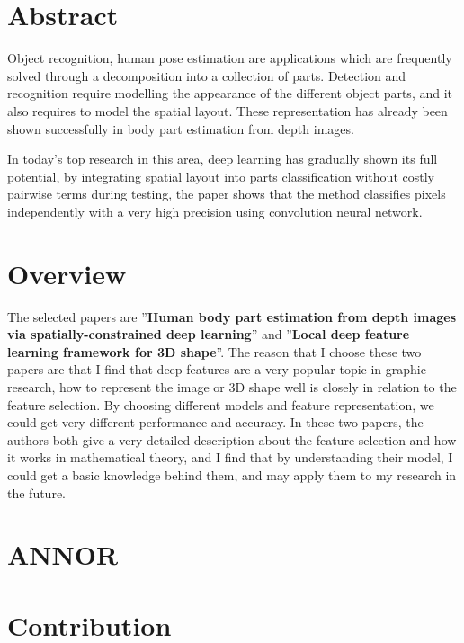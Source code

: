 \documentclass[pdftex,12pt,a4paper]{article}
\begin{document}


\section{Abstract}
Object recognition, human pose estimation are applications which are frequently solved through a decomposition into a collection of parts. Detection and recognition require modelling the appearance of the different object parts, and it also requires to model the spatial layout. These representation has already been shown successfully in body part estimation from depth images.

In today's top research in this area, deep learning has gradually shown its full potential, by integrating spatial layout into parts classification without costly pairwise terms during testing, the paper shows that the method classifies pixels independently with a very high precision using convolution neural network.

\section{Overview}
The selected papers are ''\textbf{Human body part estimation from depth images via spatially-constrained deep learning}'' and ''\textbf{Local deep feature learning framework for 3D shape}''. The reason that I choose these two papers are that I find that deep features are a very popular topic in graphic research, how to represent the image or 3D shape well is closely in relation to the feature selection. By choosing different models and feature representation, we could get very different performance and accuracy. In these two papers, the authors both give a very detailed description about the feature selection and how it works in mathematical theory, and I find that by understanding their model, I could get a basic knowledge behind them, and may apply them to my research in the future.

\subsection{}



\section{ANNOR}



\section{Contribution}
\end{document}

